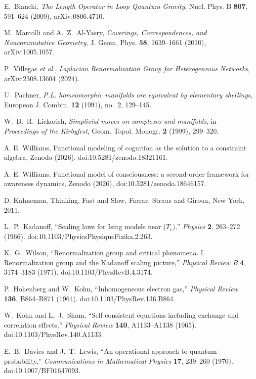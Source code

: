 \documentclass[10pt,twoside,a5paper]{article}
\theoremstyle{definition}
\begin{document}
\begin{eref}
E.~Bianchi,
\emph{The Length Operator in Loop Quantum Gravity},
Nucl. Phys. B \textbf{807}, 591--624 (2009),
arXiv:0806.4710.

M.~Marcolli and A.~Z.~Al-Yasry,
\emph{Coverings, Correspondences, and Noncommutative Geometry},
J. Geom. Phys. \textbf{58}, 1639--1661 (2010),
arXiv:1005.1057.

P.~Villegas \emph{et al.},
\emph{Laplacian Renormalization Group for Heterogeneous Networks},
arXiv:2308.13604 (2024).

U.~Pachner,
\emph{P.L. homeomorphic manifolds are equivalent by elementary shellings},
European J. Combin. \textbf{12} (1991), no.~2, 129--145.

W.~B.~R.~Lickorish,
\emph{Simplicial moves on complexes and manifolds},
in \emph{Proceedings of the Kirbyfest},
Geom. Topol. Monogr. \textbf{2} (1999), 299--320.

A. E. Williams, Functional modeling of cognition as the solution to a constraint
algebra, Zenodo (2026), doi:10.5281/zenodo.18321161.

A. E. Williams, Functional model of consciousness: a second-order framework for
awareness dynamics, Zenodo (2026), doi:10.5281/zenodo.18646157.

D. Kahneman, Thinking, Fast and Slow, Farrar, Straus and Giroux, New York, 2011.

L.~P.~Kadanoff,
``Scaling laws for Ising models near ($T_c$),''
\emph{Physics} \textbf{2}, 263--272 (1966).
doi:10.1103/PhysicsPhysiqueFizika.2.263.

K.~G.~Wilson,
``Renormalization group and critical phenomena. I. Renormalization group and
the Kadanoff scaling picture,''
\emph{Physical Review B} \textbf{4}, 3174--3183 (1971).
doi:10.1103/PhysRevB.4.3174.

P.~Hohenberg and W.~Kohn,
``Inhomogeneous electron gas,''
\emph{Physical Review} \textbf{136}, B864--B871 (1964).
doi:10.1103/PhysRev.136.B864.

W.~Kohn and L.~J.~Sham,
``Self-consistent equations including exchange and correlation effects,''
\emph{Physical Review} \textbf{140}, A1133--A1138 (1965).
doi:10.1103/PhysRev.140.A1133.

E.~B.~Davies and J.~T.~Lewis,
``An operational approach to quantum probability,''
\emph{Communications in Mathematical Physics} \textbf{17}, 239--260 (1970).
doi:10.1007/BF01647093.


\end{eref}
\end{document}
